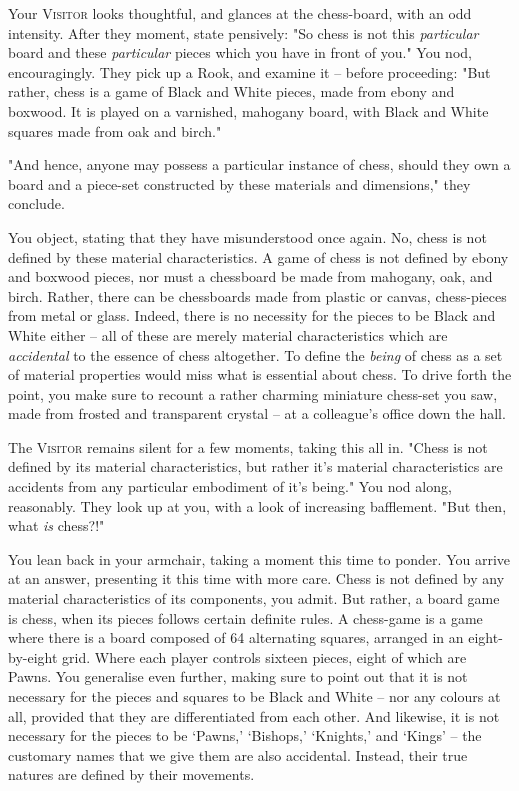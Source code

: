 
Your \textsc{Visitor} looks thoughtful, and glances at the chess-board, with an odd intensity. After they moment, state pensively: "So chess is not this \emph{particular} board and these \emph{particular} pieces which you have in front of you." You nod, encouragingly. They pick up a Rook, and examine it -- before proceeding: "But rather, chess is a game of Black and White pieces, made from ebony and boxwood. It is played on a varnished, mahogany board, with Black and White squares made from oak and birch."

"And hence, anyone may possess a particular instance of chess, should they own a board and a piece-set constructed by these materials and dimensions," they conclude.

You object, stating that they have misunderstood once again. No, chess is not defined by these material characteristics. A game of chess is not defined by ebony and boxwood pieces, nor must a chessboard be made from mahogany, oak, and birch. Rather, there can be chessboards made from plastic or canvas, chess-pieces from metal or glass. Indeed, there is no necessity for the pieces to be Black and White either -- all of these are merely material characteristics which are \emph{accidental} to the essence of chess altogether. To define the \emph{being} of chess as a set of material properties would miss what is essential about chess. To drive forth the point, you make sure to recount a rather charming miniature chess-set you saw, made from frosted and transparent crystal -- at a colleague's office down the hall.

The \textsc{Visitor} remains silent for a few moments, taking this all in. "Chess is not defined by its material characteristics, but rather it's material characteristics are accidents from any particular embodiment of it's being." You nod along, reasonably. They look up at you, with a look of increasing bafflement. "But then, what \emph{is} chess?!"


You lean back in your armchair, taking a moment this time to ponder. You arrive at an answer, presenting it this time with more care. Chess is not defined by any material characteristics of its components, you admit. But rather, a board game is chess, when its pieces follows certain definite rules. A chess-game is a game where there is a board composed of 64 alternating squares, arranged in an eight-by-eight grid. Where each player controls sixteen pieces, eight of which are Pawns. You generalise even further, making sure to point out that it is not necessary for the pieces and squares to be Black and White -- nor any colours at all, provided that they are differentiated from each other. And likewise, it is not necessary for the pieces to be `Pawns,' `Bishops,' `Knights,' and `Kings' -- the customary names that we give them are also accidental. Instead, their true natures are defined by their movements.

